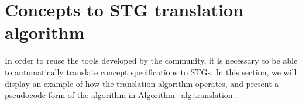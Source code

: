 \documentclass[british,conference,compsoc]{IEEEtran}
\newcommand{\noun}[1]{\textsc{#1}}
\begin{document}
%  
%
%  
%
%
%

\vspace{-1mm}

\section{Concepts to STG translation algorithm\label{sec:algorithm}}

\vspace{-2mm}
%

In order to reuse the tools developed by the community, it is
necessary to be able to automatically translate concept specifications to STGs.
In this section, we will display an example of how the translation algorithm 
operates, and present a pseudocode form of the algorithm in 
Algorithm~\ref{alg:translation}. 
\end{document}

